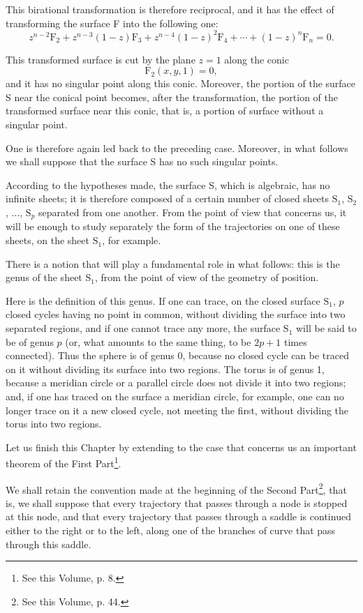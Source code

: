 \documentclass[11pt]{article}
\begin{document}
This birational transformation is therefore reciprocal, and it has the effect of transforming the surface F into the following one:
\[
z^{n-2}\mathrm{F}_2+z^{n-3}(1-z)\mathrm{F}_3+z^{n-4}(1-z)^2\mathrm{F}_4+\cdots+(1-z)^n\mathrm{F}_n=0.
\]

This transformed surface is cut by the plane $z=1$ along the conic
\[
\mathrm{F}_2(x,y,1)=0,
\]
and it has no singular point along this conic. Moreover, the portion of the surface S near the conical point becomes, after the transformation, the portion of the transformed surface near this conic, that is, a portion of surface without a singular point.

One is therefore again led back to the preceding case. Moreover, in what follows we shall suppose that the surface S has no such singular points.

According to the hypotheses made, the surface S, which is algebraic, has no infinite sheets; it is therefore composed of a certain number of closed sheets $\mathrm{S}_1$, $\mathrm{S}_2$, $\ldots$, $\mathrm{S}_p$ separated from one another. From the point of view that concerns us, it will be enough to study separately the form of the trajectories on one of these sheets, on the sheet $\mathrm{S}_1$, for example.

There is a notion that will play a fundamental role in what follows: this is the genus of the sheet $\mathrm{S}_1$, from the point of view of the geometry of position.

Here is the definition of this genus. If one can trace, on the closed surface $\mathrm{S}_1$, $p$ closed cycles having no point in common, without dividing the surface into two separated regions, and if one cannot trace any more, the surface $\mathrm{S}_1$ will be said to be of genus $p$ (or, what amounts to the same thing, to be $2p+1$ times connected). Thus the sphere is of genus 0, because no closed cycle can be traced on it without dividing its surface into two regions. The torus is of genus 1, because a meridian circle or a parallel circle does not divide it into two regions; and, if one has traced on the surface a meridian circle, for example, one can no longer trace on it a new closed cycle, not meeting the first, without dividing the torus into two regions.

Let us finish this Chapter by extending to the case that concerns us an important theorem of the First Part\footnote{See this Volume, p. 8.}.

We shall retain the convention made at the beginning of the Second Part\footnote{See this Volume, p. 44.}, that is, we shall suppose that every trajectory that passes through a node is stopped at this node, and that every trajectory that passes through a saddle is continued either to the right or to the left, along one of the branches of curve that pass through this saddle.
\end{document}
